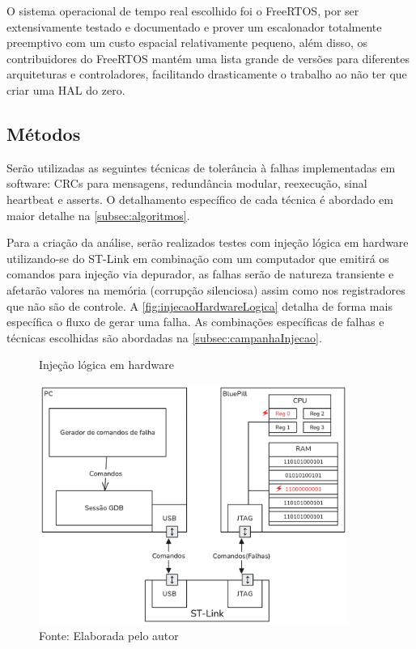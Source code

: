 O sistema operacional de tempo real escolhido foi o FreeRTOS, por ser extensivamente testado e documentado e prover um escalonador totalmente preemptivo com um custo espacial relativamente pequeno, além disso, os contribuidores do FreeRTOS mantém uma lista grande de versões para diferentes arquiteturas e controladores, facilitando drasticamente o trabalho ao não ter que criar uma HAL do zero.

\subsection{Métodos}

Serão utilizadas as seguintes técnicas de tolerância à falhas implementadas em software: CRCs para mensagens, redundância modular, reexecução, sinal heartbeat e asserts. O detalhamento específico de cada técnica é abordado em maior detalhe na \autoref{subsec:algoritmos}.

Para a criação da análise, serão realizados testes com injeção lógica em hardware utilizando-se do ST-Link em combinação com um computador que emitirá os comandos para injeção via depurador, as falhas serão de natureza transiente e afetarão valores na memória (corrupção silenciosa) assim como nos registradores que não são de controle. A \autoref{fig:injecaoHardwareLogica} detalha de forma mais específica o fluxo de gerar uma falha. As combinações específicas de falhas e técnicas escolhidas são abordadas na \autoref{subsec:campanhaInjecao}.

\begin{figure}[H]
   \centering
   \captionsetup{justification=centering}
   \caption{Injeção lógica em hardware}
   \includegraphics[width=0.90\textwidth]{assets/injecao_hardware.png}
   \captionsetup{justification=raggedright}
  \caption*{Fonte: Elaborada pelo autor}
   \label{fig:injecaoHardwareLogica}
\end{figure}

